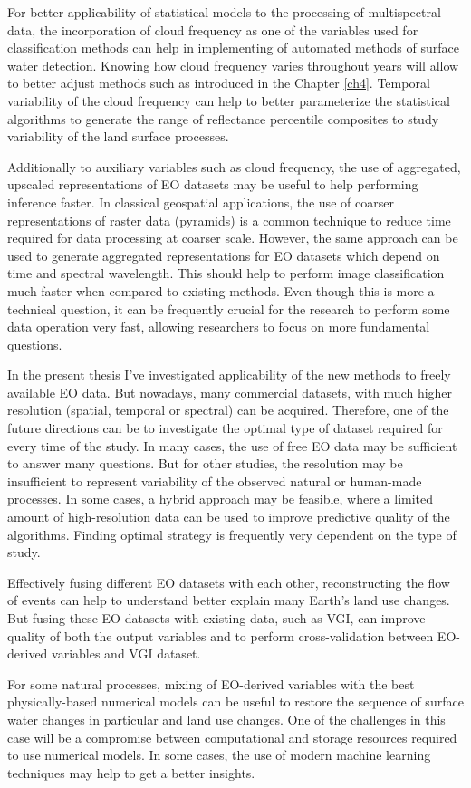 For better applicability of statistical models to the processing of multispectral data, the incorporation of cloud frequency as one of the variables used for classification methods can help in implementing of automated methods of surface water detection. Knowing how cloud frequency varies throughout years will allow to better adjust methods such as introduced in the Chapter \ref{ch4}. Temporal variability of the cloud frequency can help to better parameterize the statistical algorithms to generate the range of reflectance percentile composites to study variability of the land surface processes.

Additionally to auxiliary variables such as cloud frequency, the use of aggregated, upscaled representations of EO datasets may be useful to help performing inference faster. In classical geospatial applications, the use of coarser representations of raster data (pyramids) is a common technique to reduce time required for data processing at coarser scale. However, the same approach can be used to generate aggregated representations for EO datasets which depend on time and spectral wavelength. This should help to perform image classification much faster when compared to existing methods. Even though this is more a technical question, it can be frequently crucial for the research to perform some data operation very fast, allowing researchers to focus on more fundamental questions.

In the present thesis I've investigated applicability of the new methods to freely available EO data. But nowadays, many commercial datasets, with much higher resolution (spatial, temporal or spectral) can be acquired. Therefore, one of the future directions can be to investigate the optimal type of dataset required for every time of the study. In many cases, the use of free EO data may be sufficient to answer many questions. But for other studies, the resolution may be insufficient to represent variability of the observed natural or human-made processes. In some cases, a hybrid approach may be feasible, where a limited amount of high-resolution data can be used to improve predictive quality of the algorithms. Finding optimal strategy is frequently very dependent on the type of study.

Effectively fusing different EO datasets with each other, reconstructing the flow of events can help to understand better explain many Earth's land use changes. But fusing these EO datasets with existing data, such as VGI, can improve quality of both the output variables and to perform cross-validation between EO-derived variables and VGI dataset.

For some natural processes, mixing of EO-derived variables with the best physically-based numerical models can be useful to restore the sequence of surface water changes in particular and land use changes. One of the challenges in this case will be a compromise between computational and storage resources required to use numerical models. In some cases, the use of modern machine learning techniques may help to get a better insights.





